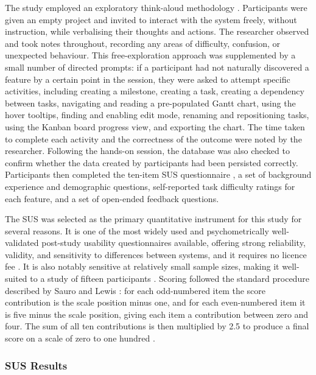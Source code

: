 \documentclass[12pt,nonacm,acmlarge,titlepage,screen]{acmart}
\begin{document}
The study employed an exploratory think-aloud methodology \cite{humayoun_2012}.
Participants were given an empty project and invited to interact with the system
freely, without instruction, while verbalising their thoughts and actions. The
researcher observed and took notes throughout, recording any areas of difficulty,
confusion, or unexpected behaviour. This free-exploration approach was supplemented
by a small number of directed prompts: if a participant had not naturally discovered
a feature by a certain point in the session, they were asked to attempt specific
activities, including creating a milestone, creating a task, creating a dependency
between tasks, navigating and reading a pre-populated Gantt chart, using the
hover tooltips, finding and enabling edit mode, renaming and repositioning tasks,
using the Kanban board progress view, and exporting the chart. The time taken to
complete each activity and the correctness of the outcome were noted by the
researcher. Following the hands-on session, the database was also checked to confirm
whether the data created by participants had been persisted correctly. Participants
then completed the ten-item SUS questionnaire \cite{brooke_1995}, a set of background
experience and demographic questions, self-reported task difficulty ratings for each
feature, and a set of open-ended feedback questions.

The SUS was selected as the primary quantitative instrument for this study for
several reasons. It is one of the most widely used and psychometrically well-validated
post-study usability questionnaires available, offering strong reliability, validity,
and sensitivity to differences between systems, and it requires no licence fee
\cite{SAURO2012185}. It is also notably sensitive at relatively small sample sizes,
making it well-suited to a study of fifteen participants \cite{SAURO2012185}.
Scoring followed the standard procedure described by Sauro and Lewis \cite{SAURO2012185}:
for each odd-numbered item the score contribution is the scale position minus one, and
for each even-numbered item it is five minus the scale position, giving each item a
contribution between zero and four. The sum of all ten contributions is then multiplied
by 2.5 to produce a final score on a scale of zero to one hundred \cite{SAURO2012185}.

\subsubsection{SUS Results}
\end{document}
